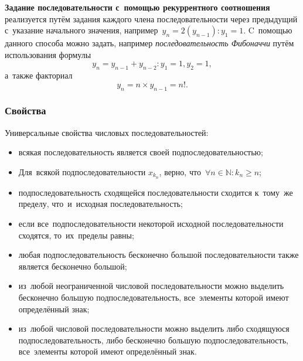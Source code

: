 \documentclass[]{scrartcl}
\begin{document}
\textbf{Задание последовательности с~помощью рекуррентного соотношения} реализуется путём задания каждого члена последовательности через предыдущий с~указание начального значения, например~${\textstyle y_n=2(y_{n-1}): y_1=1}$. C~помощью данного способа можно задать, например \emph{последовательность Фибоначчи} путём использования формулы
\begin{equation}\label{eq:fibonacci}
y_n=y_{n-1}+y_{n-2}: y_1=1, y_2=1,
\end{equation}
а~также факториал
\begin{equation}\label{eq:factorial}
y_n=n \times y_{n-1}=n!.
\end{equation}

\subsubsection{Свойства}
Универсальные свойства числовых последовательностей:
\begin{itemize}
	\item всякая последовательность является своей подпоследовательностью;
	\item Для~всякой подпоследовательности ${\textstyle x_{k_{n}}}$, верно, что~${\textstyle \forall n\in \mathbb {N} \colon k_{n}\geqslant n}$;
	\item подпоследовательность сходящейся последовательности сходится к~тому~же пределу, что~и~исходная последовательность;
	\item если все~подпоследовательности некоторой исходной последовательности сходятся, то~их~пределы равны;
	\item любая подпоследовательность бесконечно большой последовательности также является бесконечно большой;
	\item из~любой неограниченной числовой последовательности можно выделить бесконечно большую подпоследовательность, все~элементы которой имеют определённый знак;
	\item из~любой числовой последовательности можно выделить либо сходящуюся подпоследовательность, либо бесконечно большую подпоследовательность, все~элементы которой имеют определённый знак.
\end{itemize}
\end{document}
